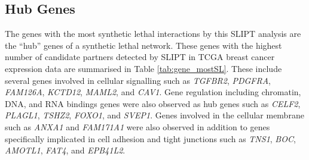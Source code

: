 \FloatBarrier

\subsection{Hub Genes}

The genes with the most synthetic lethal interactions by this SLIPT analysis are the ``hub'' genes of a synthetic lethal network. These genes with the highest number of candidate partners detected by SLIPT in TCGA breast cancer expression data are summarised in Table \ref{tab:gene_mostSL}.  These include several genes involved in cellular signalling such as \textit{TGFBR2}, \textit{PDGFRA}, \textit{FAM126A}, \textit{KCTD12}, \textit{MAML2}, and \textit{CAV1}. Gene regulation including chromatin, DNA, and RNA bindings genes were also observed as hub genes such as \textit{CELF2}, \textit{PLAGL1}, \textit{TSHZ2}, \textit{FOXO1}, and \textit{SVEP1}. Genes involved in the cellular membrane such as \textit{ANXA1} and \textit{FAM171A1} were also observed in addition to genes specifically implicated in cell adhesion and tight junctions such as \textit{TNS1}, \textit{BOC}, \textit{AMOTL1}, \textit{FAT4}, and \textit{EPB41L2}.


